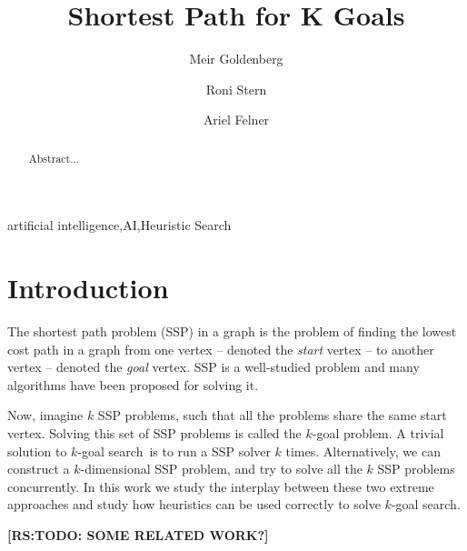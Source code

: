 \documentclass{aicom2e}
\newcommand{\kgs}{$k$-goal search}
\newcommand{\roni}[1]{\textbf{[RS:#1]}}
\begin{document}
\begin{frontmatter}                           %
%
\title{Shortest Path for K Goals}
\maketitle
%
\author[]{Meir Goldenberg}
\address{The Jerusalem College of Technology\\ Jerusalem, Israel\\
	E-mail: mgoldenbe@gmail.com}
\author[]{Roni Stern}
\address{Ben Gurion University of the Negev\\ Be'er Sheva, Israel\\
E-mail: roni.stern@gmail.com}
\author[]{Ariel Felner}
\address{Ben Gurion University of the Negev\\ Be'er Sheva, Israel\\
	E-mail: felner@bgu.ac.il}

\begin{abstract}
Abstract...

\end{abstract}

\begin{keyword}
artificial intelligence\sep AI\sep Heuristic Search
\end{keyword}
%
\end{frontmatter}

\section*{Introduction}


The shortest path problem (SSP) in a graph is the problem of finding the lowest cost path in a graph from one vertex -- denoted the {\em start} vertex -- to another vertex -- denoted the {\em goal} vertex. 
SSP is a well-studied problem and many algorithms have been proposed for solving it. 

Now, imagine $k$ SSP problems, such that all the problems share the same start vertex. 
Solving this set of SSP problems is called the $k$-goal problem. 
A trivial solution to \kgs\ is to run a SSP solver $k$ times. Alternatively, 
we can construct a $k$-dimensional SSP problem, and try to solve all the $k$ SSP problems concurrently. 
In this work we study the interplay between these two extreme approaches and
study how heuristics can be used correctly to solve \kgs. 


\roni{TODO: SOME RELATED WORK?}
\end{document}
